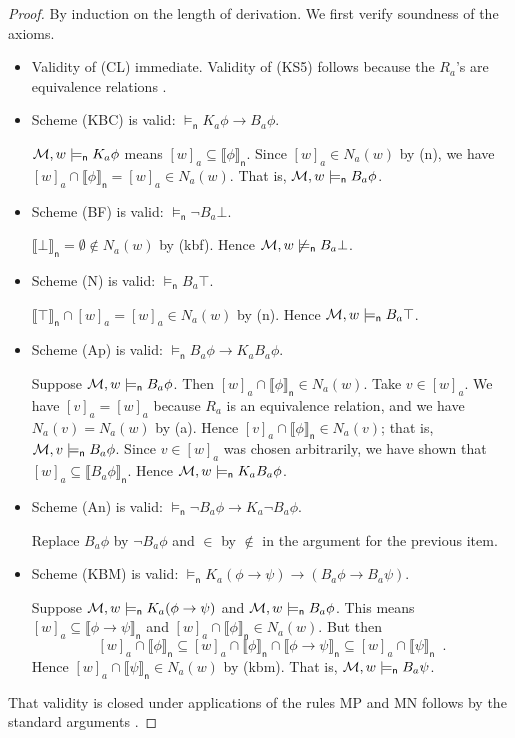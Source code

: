 \documentclass[12pt]{article}
\theoremstyle{definition}
\newcommand{\M}{{\cal M}}      %
\newcommand{\modelsn}{\models_{\mathsf{n}}}                  %
\newcommand{\semn}[1]{\llbracket{#1}\rrbracket_{\mathsf{n}}} %
\begin{document}
\begin{proof}
  By induction on the length of derivation.  We first
  verify soundness of the axioms.
  \begin{itemize}
  \item Validity of (CL)
    immediate. Validity of (KS5) follows because the $R_a$'s are equivalence relations
    \cite{BlaRijVen:ml}.

  \item Scheme (KBC) is valid: $\modelsn K_a\phi\to B_a\phi$.

    $\M,w\modelsn K_a\phi$ means $[w]_a\subseteq\semn{\phi}$.  Since
    $[w]_a\in N_a(w)$ by (n), we have $[w]_a\cap\semn{\phi}=[w]_a\in
    N_a(w)$.  That is, $\M,w\modelsn B_a\phi$.

  \item Scheme (BF) is valid: $\modelsn\lnot B_a\bot$.

    $\semn{\bot}=\emptyset\notin N_a(w)$ by (kbf).  Hence
    $\M,w\not\modelsn B_a\bot$.

  \item Scheme (N) is valid: $\modelsn B_a\top$.

    $\semn{\top}\cap[w]_a=[w]_a\in N_a(w)$ by (n).  Hence
    $\M,w\modelsn B_a\top$.

  \item Scheme (Ap) is valid: $\modelsn B_a\phi\to K_a B_a\phi$.

    Suppose $\M,w\modelsn B_a\phi$. Then $[w]_a\cap\semn{\phi}\in
    N_a(w)$.  Take $v\in[w]_a$.  We have $[v]_a=[w]_a$ because $R_a$
    is an equivalence relation, and we have $N_a(v)=N_a(w)$ by (a).
    Hence $[v]_a\cap\semn{\phi}\in N_a(v)$; that is, $\M,v\modelsn
    B_a\phi$.  Since $v\in [w]_a$ was chosen arbitrarily, we have
    shown that $[w]_a\subseteq\semn{B_a\phi}$.  Hence $\M,w\modelsn
    K_a B_a\phi$.

  \item Scheme (An) is valid: $\modelsn \lnot B_a\phi\to K_a\lnot B_a\phi$.

    Replace $B_a\phi$ by $\lnot B_a\phi$ and $\in$ by $\notin$ in the
    argument for the previous item.

  \item Scheme (KBM) is valid: $\modelsn K_a(\phi\to\psi)\to(B_a\phi\to B_a\psi)$.

    Suppose $\M,w\modelsn K_a(\phi\to\psi)$ and $\M,w\modelsn
    B_a\phi$.  This means $[w]_a\subseteq\semn{\phi\to\psi}$ and
    $[w]_a\cap\semn{\phi}\in N_a(w)$. But then
    \[
    [w]_a\cap\semn{\phi}\subseteq
    [w]_a\cap\semn{\phi}\cap\semn{\phi\to\psi}\subseteq
    [w]_a\cap\semn{\psi}\enspace.
    \]
    Hence $[w]_a\cap\semn{\psi}\in N_a(w)$ by (kbm).  That is,
    $\M,w\modelsn B_a\psi$.
  \end{itemize}
  That validity is closed under applications of the rules MP and MN
  follows by the standard arguments \cite{BlaRijVen:ml}.
\end{proof}
\end{document}

